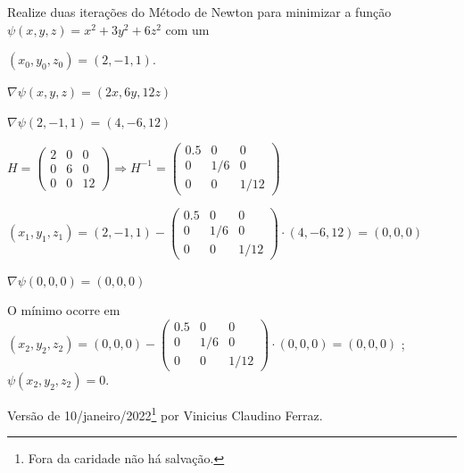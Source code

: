 \documentclass{rbfin}
\begin{document}
\vspace{6mm}

\doublespacing

Realize duas iterações do Método de Newton para minimizar a função $\psi(x, y, z) = x^2 + 3 y^2 + 6 z^2$ com um 

$(x_0, y_0, z_0) = (2, -1, 1)$.

$\nabla \psi(x,y,z) = (2x, 6y, 12z)$

$\nabla \psi(2, -1, 1) = (4, -6, 12)$

$H = \begin{pmatrix} 2 & 0 & 0 \\ 0 & 6 & 0 \\ 0 & 0 & 12 \end{pmatrix} \Rightarrow H^{-1} = \begin{pmatrix} 0.5 & 0 & 0 \\ 0 & 1/6 & 0 \\ 0 & 0 & 1/12 \end{pmatrix}$

$(x_1, y_1, z_1) = (2, -1, 1) - \begin{pmatrix} 0.5 & 0 & 0 \\ 0 & 1/6 & 0 \\ 0 & 0 & 1/12 \end{pmatrix} \cdot (4, -6, 12) = (0 , 0, 0)$

$\nabla \psi(0, 0, 0) = (0, 0, 0)$

O mínimo ocorre em $(x_2, y_2, z_2) = (0, 0, 0) - \begin{pmatrix} 0.5 & 0 & 0 \\ 0 & 1/6 & 0 \\ 0 & 0 & 1/12 \end{pmatrix} \cdot (0, 0, 0) = (0, 0, 0)$ ; $\psi(x_2, y_2, z_2) = 0$.

\singlespacing

\vspace{6mm}

Versão de 10/janeiro/2022\footnote{Fora da caridade não há salvação.} por Vinicius Claudino Ferraz.
\end{document}
